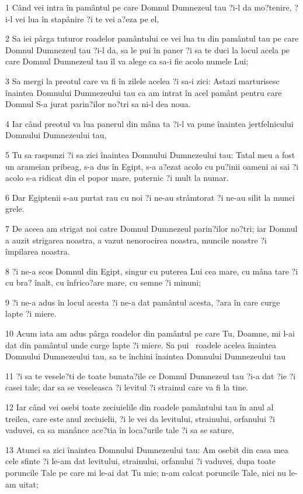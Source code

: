 \par 1 Când vei intra în pamântul pe care Domnul Dumnezeul tau ?i-l da mo?tenire, ?i-l vei lua în stapânire ?i te vei a?eza pe el,
\par 2 Sa iei pârga tuturor roadelor pamântului ce vei lua tu din pamântul tau pe care Domnul Dumnezeul tau ?i-l da, sa le pui în paner ?i sa te duci la locul acela pe care Domnul Dumnezeul tau îl va alege ca sa-i fie acolo numele Lui;
\par 3 Sa mergi la preotul care va fi în zilele acelea ?i sa-i zici: Astazi marturisesc înaintea Domnului Dumnezeului tau ca am intrat în acel pamânt pentru care Domnul S-a jurat parin?ilor no?tri sa ni-l dea noua.
\par 4 Iar când preotul va lua panerul din mâna ta ?i-l va pune înaintea jertfelnicului Domnului Dumnezeului tau,
\par 5 Tu sa raspunzi ?i sa zici înaintea Domnului Dumnezeului tau: Tatal meu a fost un arameian pribeag, s-a dus în Egipt, s-a a?ezat acolo cu pu?inii oameni ai sai ?i acolo s-a ridicat din el popor mare, puternic ?i mult la numar.
\par 6 Dar Egiptenii s-au purtat rau cu noi ?i ne-au strâmtorat ?i ne-au silit la munci grele.
\par 7 De aceea am strigat noi catre Domnul Dumnezeul parin?ilor no?tri; iar Domnul a auzit strigarea noastra, a vazut nenorocirea noastra, muncile noastre ?i împilarea noastra.
\par 8 ?i ne-a scos Domnul din Egipt, singur cu puterea Lui cea mare, cu mâna tare ?i cu bra? înalt, cu înfrico?are mare, cu semne ?i minuni;
\par 9 ?i ne-a adus în locul acesta ?i ne-a dat pamântul acesta, ?ara în care curge lapte ?i miere.
\par 10 Acum iata am adus pârga roadelor din pamântul pe care Tu, Doamne, mi l-ai dat din pamântul unde curge lapte ?i miere. Sa pui  roadele acelea înaintea Domnului Dumnezeului tau, sa te închini înaintea Domnului Dumnezeului tau
\par 11 ?i sa te vesele?ti de toate bunata?ile ce Domnul Dumnezeul tau ?i-a dat ?ie ?i casei tale; dar sa se veseleasca ?i levitul ?i strainul care va fi la tine.
\par 12 Iar când vei osebi toate zeciuielile din roadele pamântului tau în anul al treilea, care este anul zeciuielii, ?i le vei da levitului, strainului, orfanului ?i vaduvei, ca sa manânce ace?tia în loca?urile tale ?i sa se sature,
\par 13 Atunci sa zici înaintea Domnului Dumnezeului tau: Am osebit din casa mea cele sfinte ?i le-am dat levitului, strainului, orfanului ?i vaduvei, dupa toate poruncile Tale pe care mi le-ai dat Tu mie; n-am calcat poruncile Tale, nici nu le-am uitat;
